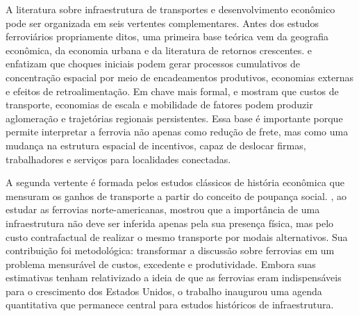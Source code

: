 \documentclass[12pt,a4paper]{article}
\begin{document}
A literatura sobre infraestrutura de transportes e desenvolvimento econômico pode ser organizada em seis vertentes complementares. Antes dos estudos ferroviários propriamente ditos, uma primeira base teórica vem da geografia econômica, da economia urbana e da literatura de retornos crescentes. \citet{myrdal1957} e \citet{hirschman1958} enfatizam que choques iniciais podem gerar processos cumulativos de concentração espacial por meio de encadeamentos produtivos, economias externas e efeitos de retroalimentação. Em chave mais formal, \citet{krugman1991} e \citet{fujita1999} mostram que custos de transporte, economias de escala e mobilidade de fatores podem produzir aglomeração e trajetórias regionais persistentes. Essa base é importante porque permite interpretar a ferrovia não apenas como redução de frete, mas como uma mudança na estrutura espacial de incentivos, capaz de deslocar firmas, trabalhadores e serviços para localidades conectadas.

A segunda vertente é formada pelos estudos clássicos de história econômica que mensuram os ganhos de transporte a partir do conceito de poupança social. \citet{fogel1964}, ao estudar as ferrovias norte-americanas, mostrou que a importância de uma infraestrutura não deve ser inferida apenas pela sua presença física, mas pelo custo contrafactual de realizar o mesmo transporte por modais alternativos. Sua contribuição foi metodológica: transformar a discussão sobre ferrovias em um problema mensurável de custos, excedente e produtividade. Embora suas estimativas tenham relativizado a ideia de que as ferrovias eram indispensáveis para o crescimento dos Estados Unidos, o trabalho inaugurou uma agenda quantitativa que permanece central para estudos históricos de infraestrutura.
\end{document}
